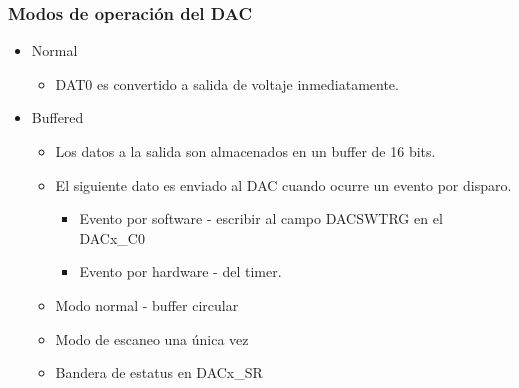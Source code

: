 \documentclass[10.5pt,scale=1.0,t,aspectratio=169,hyperref={pdfpagelabels=false}]{beamer}
\begin{document}
\begin{frame}
	\frametitle{Modos de operación del DAC}
	 \begin{itemize}
	 	\item Normal
	 	\begin{itemize}
	 		\item DAT0 es convertido a salida de voltaje inmediatamente.
	 	\end{itemize}
	 	\item Buffered
	 	\begin{itemize}
	 		\item Los datos a la salida son almacenados en un buffer de 16 bits.
	 		\item El siguiente dato es enviado al DAC cuando ocurre un evento por disparo. 
	 		\begin{itemize}
	 			\item Evento por software - escribir al campo DACSWTRG en el DACx\_C0
	 			\item Evento por hardware - del timer. 
	 		\end{itemize}
 		\item Modo normal - buffer circular
 		\item Modo de escaneo una única vez
 		\item Bandera de estatus en DACx\_SR
	 	\end{itemize}
	 \end{itemize}
\end{frame}
\end{document}
